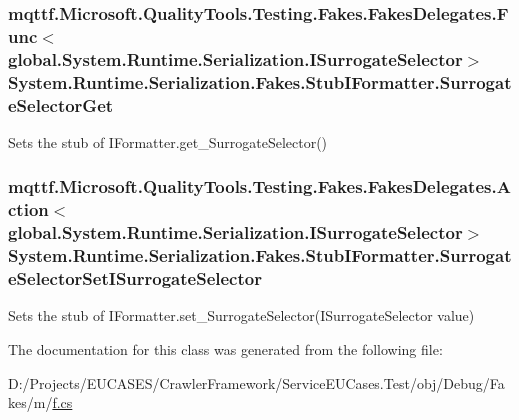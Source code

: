 \hypertarget{class_system_1_1_runtime_1_1_serialization_1_1_fakes_1_1_stub_i_formatter_abadc38b385e19d6f9456e9570ffc6d67}{
\subsubsection[{Surrogate\-Selector\-Get}]{\setlength{\rightskip}{0pt plus 5cm}mqttf.\-Microsoft.\-Quality\-Tools.\-Testing.\-Fakes.\-Fakes\-Delegates.\-Func$<$global.\-System.\-Runtime.\-Serialization.\-I\-Surrogate\-Selector$>$ System.\-Runtime.\-Serialization.\-Fakes.\-Stub\-I\-Formatter.\-Surrogate\-Selector\-Get}}\label{class_system_1_1_runtime_1_1_serialization_1_1_fakes_1_1_stub_i_formatter_abadc38b385e19d6f9456e9570ffc6d67}


Sets the stub of I\-Formatter.\-get\-\_\-\-Surrogate\-Selector()

\hypertarget{class_system_1_1_runtime_1_1_serialization_1_1_fakes_1_1_stub_i_formatter_a7080f9eaf6b3bee6ac91ce8d952af498}{
\subsubsection[{Surrogate\-Selector\-Set\-I\-Surrogate\-Selector}]{\setlength{\rightskip}{0pt plus 5cm}mqttf.\-Microsoft.\-Quality\-Tools.\-Testing.\-Fakes.\-Fakes\-Delegates.\-Action$<$global.\-System.\-Runtime.\-Serialization.\-I\-Surrogate\-Selector$>$ System.\-Runtime.\-Serialization.\-Fakes.\-Stub\-I\-Formatter.\-Surrogate\-Selector\-Set\-I\-Surrogate\-Selector}}\label{class_system_1_1_runtime_1_1_serialization_1_1_fakes_1_1_stub_i_formatter_a7080f9eaf6b3bee6ac91ce8d952af498}


Sets the stub of I\-Formatter.\-set\-\_\-\-Surrogate\-Selector(\-I\-Surrogate\-Selector value)



The documentation for this class was generated from the following file\-:\begin{DoxyCompactItemize}
\item 
D\-:/\-Projects/\-E\-U\-C\-A\-S\-E\-S/\-Crawler\-Framework/\-Service\-E\-U\-Cases.\-Test/obj/\-Debug/\-Fakes/m/\hyperlink{m_2f_8cs}{f.\-cs}\end{DoxyCompactItemize}
